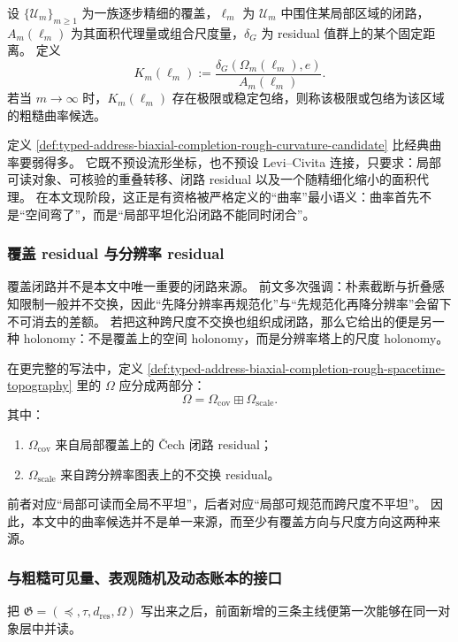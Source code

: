 \begin{definition}[粗糙曲率候选]\label{def:typed-address-biaxial-completion-rough-curvature-candidate}
设 \(\{\mathcal U_m\}_{m\ge 1}\) 为一族逐步精细的覆盖，\(\ell_m\) 为 \(\mathcal U_m\) 中围住某局部区域的闭路，\(A_m(\ell_m)\) 为其面积代理量或组合尺度量，\(\delta_G\) 为 residual 值群上的某个固定距离。
定义
\[
K_m(\ell_m)
:=
\frac{\delta_G(\Omega_m(\ell_m),e)}{A_m(\ell_m)}.
\]
若当 \(m\to\infty\) 时，\(K_m(\ell_m)\) 存在极限或稳定包络，则称该极限或包络为该区域的粗糙曲率候选。
\end{definition}

定义 \ref{def:typed-address-biaxial-completion-rough-curvature-candidate} 比经典曲率要弱得多。
它既不预设流形坐标，也不预设 Levi--Civita 连接，只要求：局部可读对象、可核验的重叠转移、闭路 residual 以及一个随精细化缩小的面积代理。
在本文现阶段，这正是有资格被严格定义的“曲率”最小语义：曲率首先不是“空间弯了”，而是“局部平坦化沿闭路不能同时闭合”。

\subsubsection{覆盖 residual 与分辨率 residual}\label{subsubsec:typed-address-biaxial-completion-cover-vs-scale-residual}
覆盖闭路并不是本文中唯一重要的闭路来源。
前文多次强调：朴素截断与折叠感知限制一般并不交换，因此“先降分辨率再规范化”与“先规范化再降分辨率”会留下不可消去的差额。
若把这种跨尺度不交换也组织成闭路，那么它给出的便是另一种 holonomy：不是覆盖上的空间 holonomy，而是分辨率塔上的尺度 holonomy。

\begin{remark}\label{rem:typed-address-biaxial-completion-two-residual-directions}
在更完整的写法中，定义 \ref{def:typed-address-biaxial-completion-rough-spacetime-topography} 里的 \(\Omega\) 应分成两部分：
\[
\Omega=\Omega_{\mathrm{cov}}\boxplus \Omega_{\mathrm{scale}}.
\]
其中：
\begin{enumerate}
  \item \(\Omega_{\mathrm{cov}}\) 来自局部覆盖上的 Čech 闭路 residual；
  \item \(\Omega_{\mathrm{scale}}\) 来自跨分辨率图表上的不交换 residual。
\end{enumerate}
前者对应“局部可读而全局不平坦”，后者对应“局部可规范而跨尺度不平坦”。
因此，本文中的曲率候选并不是单一来源，而至少有覆盖方向与尺度方向这两种来源。
\end{remark}

\subsubsection{与粗糙可见量、表观随机及动态账本的接口}\label{subsubsec:typed-address-biaxial-completion-rough-spacetime-interfaces}
把 \(\mathfrak G=(\preceq,\tau,d_{\mathrm{res}},\Omega)\) 写出来之后，前面新增的三条主线便第一次能够在同一对象层中并读。


